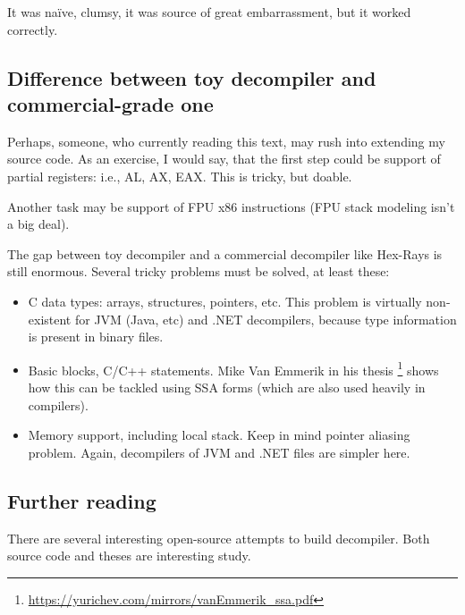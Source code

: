 It was naïve, clumsy, it was source of great embarrassment, but it worked correctly.

\subsection{Difference between toy decompiler and commercial-grade one}

Perhaps, someone, who currently reading this text, may rush into extending my source code.
As an exercise, I would say, that the first step could be support of partial registers: i.e., AL, AX, EAX.
This is tricky, but doable.

Another task may be support of \ac{FPU} x86 instructions (\ac{FPU} stack modeling isn't a big deal).

The gap between toy decompiler and a commercial decompiler like Hex-Rays is still enormous.
Several tricky problems must be solved, at least these:

\begin{itemize}
\item C data types: arrays, structures, pointers, etc.
This problem is virtually non-existent for \ac{JVM} (Java, etc) and .NET decompilers, because type information
is present in binary files.

\item Basic blocks, C/C++ statements. Mike Van Emmerik in his thesis
\footnote{\url{https://yurichev.com/mirrors/vanEmmerik_ssa.pdf}} shows how this can be tackled using \ac{SSA} forms
(which are also used heavily in compilers).

\item Memory support, including local stack. Keep in mind pointer aliasing problem.
Again, decompilers of \ac{JVM} and .NET files are simpler here.
\end{itemize}

\subsection{Further reading}

There are several interesting open-source attempts to build decompiler.
Both source code and theses are interesting study.

